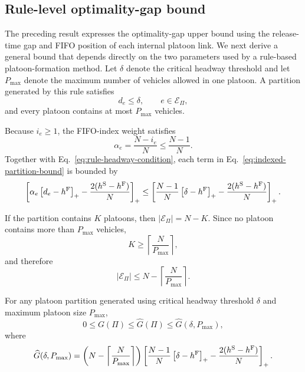 \subsection{Rule-level optimality-gap bound}

The preceding result expresses the optimality-gap upper bound using the
release-time gap and FIFO position of each internal platoon link. We next
derive a general bound that depends directly on the two parameters used by a
rule-based platoon-formation method. Let \(\delta\) denote the critical
headway threshold and let \(P_{\max}\) denote the maximum number of vehicles
allowed in one platoon. A partition generated by this rule satisfies
\begin{equation}
d_e\le\delta,
\qquad e\in\mathcal E_\Pi,
\label{eq:rule-headway-condition}
\end{equation}
and every platoon contains at most \(P_{\max}\) vehicles.

Because \(i_e\ge1\), the FIFO-index weight satisfies
\begin{equation}
\alpha_e=\frac{N-i_e}{N}\le\frac{N-1}{N}.
\end{equation}
Together with Eq.~\eqref{eq:rule-headway-condition}, each term in
Eq.~\eqref{eq:indexed-partition-bound} is bounded by
\begin{equation}
\left[
\alpha_e\left[d_e-h^{\mathrm{F}}\right]_{+}
-\frac{2(h^{\mathrm{S}}-h^{\mathrm{F}})}{N}
\right]_{+}
\le
\left[
\frac{N-1}{N}\left[\delta-h^{\mathrm{F}}\right]_{+}
-\frac{2(h^{\mathrm{S}}-h^{\mathrm{F}})}{N}
\right]_{+}.
\label{eq:uniform-link-bound}
\end{equation}

If the partition contains \(K\) platoons, then
\(|\mathcal E_\Pi|=N-K\). Since no platoon contains more than
\(P_{\max}\) vehicles,
\begin{equation}
K\ge\left\lceil\frac{N}{P_{\max}}\right\rceil,
\end{equation}
and therefore
\begin{equation}
|\mathcal E_\Pi|
\le
N-\left\lceil\frac{N}{P_{\max}}\right\rceil.
\label{eq:rule-link-count-bound}
\end{equation}

\begin{corollary}
\label{cor:rule-level-loss-bound}
For any platoon partition generated using critical headway threshold
\(\delta\) and maximum platoon size \(P_{\max}\),
\begin{equation}
0\le G(\Pi)
\le \widehat{G}(\Pi)
\le \widehat{G}(\delta,P_{\max}),
\label{eq:rule-level-gap-chain}
\end{equation}
where
\begin{equation}
\widehat{G}(\delta,P_{\max})
=
\left(
N-\left\lceil\frac{N}{P_{\max}}\right\rceil
\right)
\left[
\frac{N-1}{N}\left[\delta-h^{\mathrm{F}}\right]_{+}
-\frac{2(h^{\mathrm{S}}-h^{\mathrm{F}})}{N}
\right]_{+}.
\label{eq:rule-level-gap-bound}
\end{equation}
\end{corollary}


